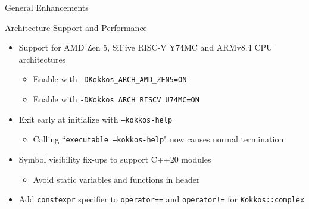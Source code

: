 
\begin{frame}[fragile]

  {\Huge General Enhancements}

  \vspace{10pt}

\end{frame}




\begin{frame}[fragile]{Architecture Support and Performance}
 \begin{itemize}
     \item Support for AMD Zen 5, SiFive RISC-V Y74MC and ARMv8.4 CPU architectures
   \begin{itemize}
       \item Enable with \texttt{-DKokkos\_ARCH\_AMD\_ZEN5=ON} 
       \item Enable with \texttt{-DKokkos\_ARCH\_RISCV\_U74MC=ON}
   \end{itemize}
  \item Exit early at initialize with \texttt{--kokkos-help}
    \begin{itemize}
      \item Calling ``\texttt{executable --kokkos-help}" now causes normal termination
   \end{itemize}  
  \item Symbol visibility fix-ups to support C++20 modules
    \begin{itemize}
      \item Avoid static variables and functions in header
    \end{itemize}
  \item Add \texttt{constexpr} specifier to \texttt{operator==} and \texttt{operator!=} for \texttt{Kokkos::complex}
 \end{itemize}
\end{frame}


